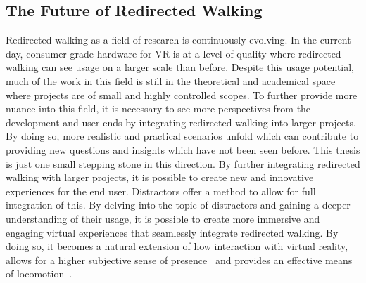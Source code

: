 \subsection{The Future of Redirected Walking}
Redirected walking as a field of research is continuously evolving. In the current day, consumer grade hardware for VR is at a level of quality where redirected walking can see usage on a larger scale than before. Despite this usage potential, much of the work in this field is still in the theoretical and academical space where projects are of small and highly controlled scopes. To further provide more nuance into this field, it is necessary to see more perspectives from the development and user ends by integrating redirected walking into larger projects. By doing so, more realistic and practical scenarios unfold which can contribute to providing new questions and insights which have not been seen before. This thesis is just one small stepping stone in this direction. By further integrating redirected walking with larger projects, it is possible to create new and innovative experiences for the end user. Distractors offer a method to allow for full integration of this. By delving into the topic of distractors and gaining a deeper understanding of their usage, it is possible to create more immersive and engaging virtual experiences that seamlessly integrate redirected walking. By doing so, it becomes a natural extension of how interaction with virtual reality, allows for a higher subjective sense of presence~\cite{peck2009evaluation, peck2011evaluation} and provides an effective means of locomotion~\cite{razzaque2001redirected, peck2011evaluation}.

\iffalse
   * Having people's first experience with VR be with redirected walking
      * They might normalise the redirected walking elements
         * \todo{Will have to look deeper into the data on people with no experience and how many detections they did}

\subsection{Distractor Salience and Optical Flow}
* How does salience impact optical flow? How does this then impact the noticeability of redirection?
* Already covered by other sections I'd say
\fi
